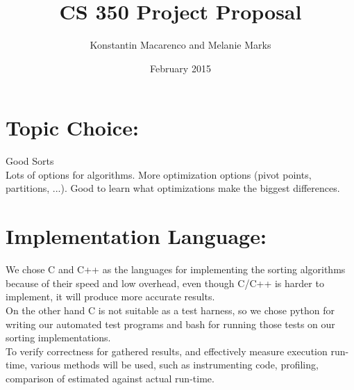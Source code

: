 \documentclass{article}
\title{CS 350 Project Proposal}
\author{Konstantin Macarenco and Melanie Marks }
\date{February 2015}
\begin{document}
\maketitle


%


\noindent
\section*{Topic Choice:}

Good Sorts\\
Lots of options for algorithms.  More optimization options (pivot points, partitions, ...).  Good to learn what optimizations make the biggest differences.\\
\section*{Implementation Language:}

We chose C and C++ as the languages for implementing the sorting algorithms because of their speed and low overhead, even though C/C++ is harder to implement, it will produce more accurate results. \\
On the other hand C is not suitable as a test harness, so we chose python for writing our automated test programs and bash for running those tests on our sorting implementations.\\
To verify correctness for gathered results, and effectively measure execution run-time, various methods will be used, such as instrumenting code, profiling, comparison of estimated against actual run-time.\\ 
\end{document}
